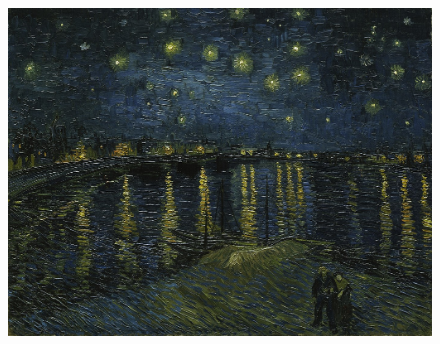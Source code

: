 \begin{itemize}
\begin{figure}[H]
          \centering
          \includegraphics[width=\linewidth]{images/starrynightovertherhone.jpg}
        \end{figure}
    \end{itemize}